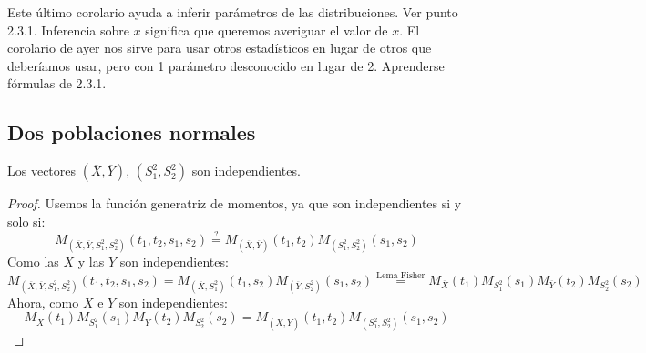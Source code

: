 \noindent
Este último corolario ayuda a inferir parámetros de las distribuciones. Ver punto 2.3.1.
Inferencia sobre $x$ significa que queremos averiguar el valor de $x$. El corolario de ayer nos sirve para usar otros estadísticos en lugar de otros que deberíamos usar, pero con 1 parámetro desconocido en lugar de 2. Aprenderse fórmulas de 2.3.1.

\subsection{Dos poblaciones normales}
\begin{teo}
    Los vectores $(\overline{X},\overline{Y})$, $(S_1^2, S_2^2)$ son independientes.
    \begin{proof}
        Usemos la función generatriz de momentos, ya que son independientes si y solo si:
        \begin{equation*}
            M_{\left(\overline{X},\overline{Y},S_1^2, S_2^2\right)}(t_1,t_2,s_1,s_2) \stackrel{\text{?}}{=} M_{\left(\overline{X},\overline{Y}\right)}(t_1,t_2) M_{\left(S_1^2,S_2^2\right)}(s_1,s_2)
        \end{equation*}
        Como las $X$ y las $Y$ son independientes:
        \begin{equation*}
            M_{\left(\overline{X},\overline{Y},S_1^2, S_2^2\right)}(t_1,t_2,s_1,s_2) = M_{\left(\overline{X},S_1^2\right)}(t_1,s_2) M_{(\overline{Y},S_2^2)}(s_1,s_2) \stackrel{\text{Lema Fisher}}{=} M_{\overline{X}}(t_1) M_{S_1^2}(s_1) M_{\overline{Y}}(t_2) M_{S_2^2}(s_2)
        \end{equation*}
        Ahora, como $X$ e $Y$ son independientes:
        \begin{equation*}
            M_{\overline{X}}(t_1) M_{S_1^2}(s_1) M_{\overline{Y}}(t_2) M_{S_2^2}(s_2) = M_{\left(\overline{X},\overline{Y}\right)}(t_1,t_2) M_{\left(S_1^2,S_2^2\right)}(s_1,s_2)
        \end{equation*}
    \end{proof}
\end{teo}

